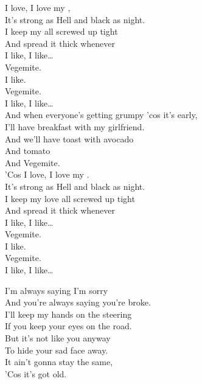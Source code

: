 I love, I love my , \\
It's strong as Hell and black as night. \\
I keep my  all screwed up tight \\
And spread it thick whenever \\
I like, I like… \\

Vegemite. \\
I like. \\
Vegemite. \\
I like, I like… \\

And when everyone's getting grumpy 'cos it's early, \\
I'll have breakfast with my girlfriend. \\
And we'll have toast with avocado \\
And tomato \\
And Vegemite. \\

'Cos I love, I love my . \\
It's strong as Hell and black as night. \\
I keep my love all screwed up tight \\
And spread it thick whenever \\
I like, I like… \\

Vegemite. \\
I like. \\
Vegemite. \\
I like, I like… \\





I'm always saying I'm sorry \\
And you're always saying you're broke. \\
I'll keep my hands on the steering  \\
If you keep your eyes on the road. \\
But it's not like you anyway \\
To hide your sad face away. \\
It ain't gonna stay the same, \\
'Cos it's got old. \\

